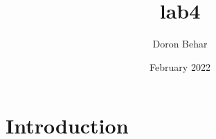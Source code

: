 \documentclass{article}
\title{lab4}
\author{Doron Behar}
\date{February 2022}
\begin{document}
\maketitle

\section{Introduction}
\end{document}
